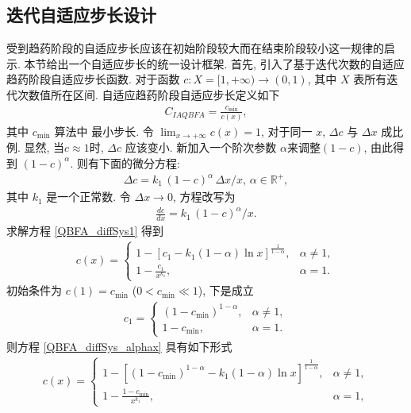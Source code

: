 \subsection{迭代自适应步长设计}
受到趋药阶段的自适应步长应该在初始阶段较大而在结束阶段较小这一规律的启示. 本节给出一个自适应步长的统一设计框架.
首先, 引入了基于迭代次数的自适应趋药阶段自适应步长函数. 对于函数 $c: X=[1, +\infty) \rightarrow (0,1)$, 其中 $X$ 表所有迭代次数值所在区间.
自适应趋药阶段自适应步长定义如下
\begin{align}\label{CIAQBFA1}
    C_{IAQBFA}=\frac {c_{\min}}{c(x)},
\end{align}
其中 $c_{\min}$ 算法中 最小步长. 令 $\lim_{x\rightarrow +\infty}c(x)=1$,
对于同一 $x$, $\Delta c$ 与 $\Delta x$ 成比例. 显然, 当$c\approx 1$时, $\Delta c$ 应该变小.
新加入一个阶次参数 $\alpha$来调整$(1-c)$, 由此得到 $(1-c)^\alpha$. 则有下面的微分方程:
\begin{eqnarray}
    \Delta c = k_1\, (1-c)^\alpha\,\Delta x/ x,\,\alpha \in \mathbb R^+,
\end{eqnarray}
其中 $k_1$ 是一个正常数. 令 $\Delta x \rightarrow 0$, 方程改写为
\begin{eqnarray}\label{QBFA_diffSys1}
    \frac{d c}{d x} = k_1\, (1-c)^\alpha/x.
\end{eqnarray}
求解方程 \eqref{QBFA_diffSys1} 得到
\begin{align}\label{QBFA_diffSys_alphax}
  c(x)= \left\{
  \begin{array}{ll}
    1- \left[c_1-k_1(1-\alpha)\ln x \right]^{\frac 1 {1-\alpha}},&  \alpha\neq 1,\\
    1-\frac {c_1} {x^{k_{1}}},&  \alpha= 1.
  \end{array}
  \right.
\end{align}
初始条件为 $c(1)=c_{\min}$ ($0<c_{\min}\ll 1$), 下是成立
\begin{align}
  c_1=\left\{
  \begin{array}{ll}
  (1-c_{\min})^ {1-\alpha},&  \alpha\neq 1,\\
  1-c_{\min},&  \alpha= 1.
  \end{array}
  \right.
\end{align}
则方程 \eqref{QBFA_diffSys_alphax} 具有如下形式
\begin{align}
c(x)=
\left\{
  \begin{array}{ll}
  1- \left[(1-c_{\min})^{{1-\alpha}}-k_1(1-\alpha)\ln x \right]^{\frac 1 {1-\alpha}},&  \alpha\neq 1,\\
  1-\frac{1-c_{\min}} {x^{k_1}},&  \alpha= 1,
  \end{array}
  \right.
\end{align}
